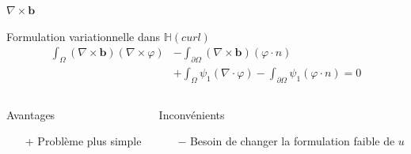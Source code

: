 \documentclass{beamer}
\newcommand{\HH}{{\mathbb{H}}}
\newcommand{\rot}{{\nabla\times}}
\newcommand{\diverg}{{\nabla\cdot}}
\begin{document}
\begin{frame}{$\rot \mathbf{b}$}
\begin{block}{Formulation variationnelle dans $\HH(curl)$}
\begin{align*}
\int_\Omega (\rot \mathbf{b})(\rot\varphi) &- \int_{\partial\Omega} (\rot \mathbf{b})(\varphi\cdot n) \\
&+\int_\Omega \psi_1(\diverg\varphi) - \int_{\partial\Omega} \psi_1(\varphi\cdot n) = 0
\end{align*}
\end{block}
\begin{columns}[t]
\begin{column}{5cm}
\begin{exampleblock}{Avantages}
\begin{itemize}
\item[+] Problème plus simple
\end{itemize}
\end{exampleblock}
\end{column}
\begin{column}{5cm}
\begin{alertblock}{Inconvénients}
\begin{itemize}
\item[$-$] Besoin de changer la formulation faible de $u$
\end{itemize}
\end{alertblock}
\end{column}
\end{columns}
\end{frame}
\end{document}
